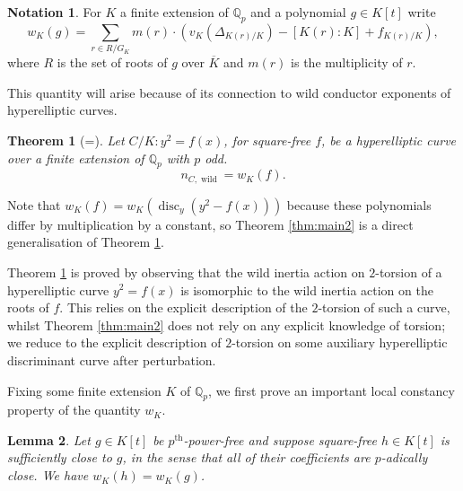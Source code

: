 \documentclass[12pt]{amsart}
\newtheorem{theorem}{Theorem}[section]
\newtheorem{lemma}[theorem]{Lemma}
\theoremstyle{definition}
\newtheorem*{notation}{Notation}
\newenvironment{remark}
  {\pushQED{\qed}\renewcommand{\qedsymbol}{$\diamondsuit$}\remarkx}
  {\popQED\endremarkx}
\theoremstyle{remark}
\newcommand{\QQ}{\mathbb{Q}}
\DeclareMathOperator{\disc}{disc}
\DeclareMathOperator{\wild}{wild}
\renewcommand{\bar}{\overline}
\begin{document}
\begin{notation}
    For $K$ a finite extension of $\QQ_p$ and a polynomial $g\in K[t]$ write
    \[w_K(g)=\sum_{r\in R/G_{K}} m(r)\cdot(v_{K}(\Delta_{K(r)/K})-[K(r):K]+f_{K(r)/K}), \]
    where $R$ is the set of roots of $g$ over $\bar{K}$ and $m(r)$ is the multiplicity of $r$.
\end{notation}

This quantity will arise because of its connection to wild conductor exponents of hyperelliptic curves.

\begin{theorem}[{=\cite[Theorem 11.3]{M2D2}}]\label{thm:M2D2}
    Let ${C}/K: y^2=f(x)$, for square-free $f$, be a hyperelliptic curve over a finite extension of $\QQ_p$ with $p$ odd.
    \[n_{{C},\wild}=w_K(f).\]
\end{theorem}

\begin{remark}
    Note that $w_K(f)=w_K(\disc_y (y^2-f(x)))$ because these polynomials differ by multiplication by a constant, so Theorem \ref{thm:main2} is a direct generalisation of Theorem \ref{thm:M2D2}.

    Theorem \ref{thm:M2D2} is proved by observing that the wild inertia action on $2$-torsion of a hyperelliptic curve $y^2=f(x)$ is isomorphic to the wild inertia action on the roots of $f$. This relies on the explicit description of the $2$-torsion of such a curve, whilst Theorem \ref{thm:main2} does not rely on any explicit knowledge of torsion; we reduce to the explicit description of $2$-torsion on some auxiliary hyperelliptic discriminant curve after perturbation.
\end{remark}

Fixing some finite extension $K$ of $\QQ_p$, we first prove an important local constancy property of the quantity $w_K$.

\begin{lemma}\label{lem:Wconst}
    Let $g\in K[t]$ be $p^\text{th}$-power-free and suppose square-free $h\in K[t]$ is sufficiently close to $g$, in the sense that all of their coefficients are $p$-adically close. We have $w_K(h)=w_K(g)$.
\end{lemma}
\end{document}
